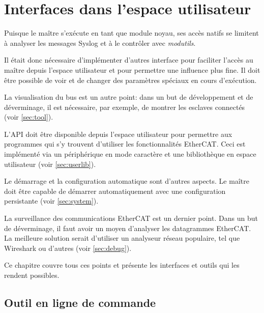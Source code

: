 \documentclass[a4paper,12pt,BCOR=6mm,bibtotoc,idxtotoc]{scrbook}
\begin{document}

\chapter{Interfaces dans l'espace utilisateur}
\label{sec:user}

Puisque le ma\^itre s'ex\'ecute en tant que module noyau, ses acc\`es
natifs se limitent \`a analyser les messages Syslog et \`a le
contr\^oler avec \textit{modutils}.

Il \'etait donc n\'ecessaire d'impl\'ementer d'autres interface pour
faciliter l'acc\`es au ma\^itre depuis l'espace utilisateur et pour
permettre une influence plus fine. Il doit \^etre possible de voir et
de changer des param\`etres sp\'eciaux en cours d'ex\'ecution.

La visualisation du bus est un autre point: dans un but de
d\'eveloppement et de d\'everminage, il est n\'ecessaire, par
exemple, de montrer les esclaves connect\'es (voir
\autoref{sec:tool}).

L'API doit \^etre disponible depuis l'espace utilisateur pour
permettre aux programmes qui s'y trouvent d'utiliser les
fonctionnalit\'es EtherCAT.  Ceci est impl\'ement\'e via un
p\'eriph\'erique en mode caract\`ere et une biblioth\`eque en espace
utilisateur (voir \autoref{sec:userlib}).

Le d\'emarrage et la configuration automatique sont d'autres aspects.
Le ma\^itre doit \^etre capable de d\'emarrer automatiquement avec une
configuration persistante (voir \autoref{sec:system}).

La surveillance des communications EtherCAT est un dernier point.
Dans un but de d\'everminage, il faut avoir un moyen d'analyser les
datagrammes EtherCAT.  La meilleure solution serait d'utiliser un
analyseur r\'eseau populaire, tel que Wireshark \cite{wireshark} ou
d'autres (voir \autoref{sec:debug}).

Ce chapitre couvre tous ces points et pr\'esente les interfaces et
outils qui les rendent possibles.


\section{Outil en ligne de commande}
\label{sec:tool}

\end{document}
